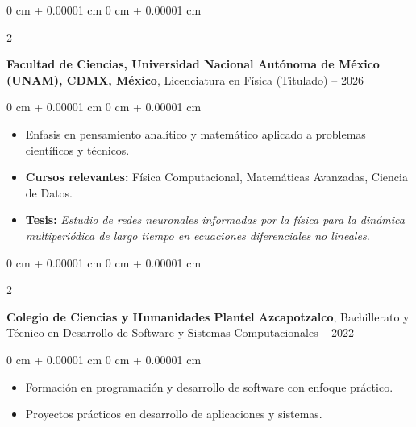 \documentclass[10pt, letterpaper]{article}
\newenvironment{highlights}{
    \begin{itemize}[
        topsep=0.10 cm,
        parsep=0.10 cm,
        partopsep=0pt,
        itemsep=0pt,
        leftmargin=0 cm + 10pt
    ]
}{
    \end{itemize}
} %
\newenvironment{onecolentry}{
    \begin{adjustwidth}{
        0 cm + 0.00001 cm
    }{
        0 cm + 0.00001 cm
    }
}{
    \end{adjustwidth}
} %
\newenvironment{twocolentry}[2][]{
    \onecolentry
    \def\secondColumn{#2}
    \setcolumnwidth{\fill, 4.5 cm}
    \begin{paracol}{2}
}{
    \switchcolumn \raggedleft \secondColumn
    \end{paracol}
    \endonecolentry
} %
\begin{document}
        \begin{twocolentry}{
            2022 -- 2026
        }
            \textbf{Facultad de Ciencias, Universidad Nacional Autónoma de México (UNAM), CDMX, México}, Licenciatura en Física (Titulado)\end{twocolentry}

        \vspace{0.10 cm}
        \begin{onecolentry}
            \begin{highlights}
                \item Enfasis en pensamiento analítico y matemático aplicado a problemas científicos y técnicos.
                \item \textbf{Cursos relevantes:} Física Computacional, Matemáticas Avanzadas, Ciencia de Datos.
                \item \textbf{Tesis:} \textit{Estudio de redes neuronales informadas por la física para la dinámica multiperiódica de largo tiempo en ecuaciones diferenciales no lineales.}
            \end{highlights}
        \end{onecolentry}
        
        \begin{twocolentry}{
            2019 -- 2022
        }
            \textbf{Colegio de Ciencias y Humanidades Plantel Azcapotzalco}, Bachillerato y Técnico en Desarrollo de Software y Sistemas Computacionales\end{twocolentry}

        \vspace{0.10 cm}
        \begin{onecolentry}
            \begin{highlights}
                \item Formación en programación y desarrollo de software con enfoque práctico.
                \item Proyectos prácticos en desarrollo de aplicaciones y sistemas.
            \end{highlights}
        \end{onecolentry}
\end{document}
